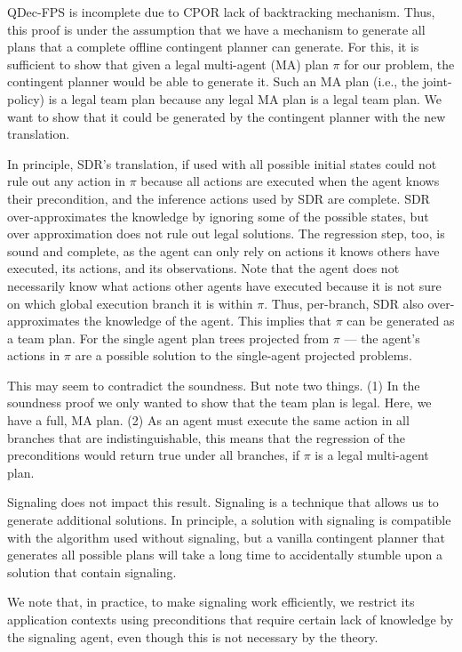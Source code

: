 \documentclass[letterpaper]{article} %
\theoremstyle{definition}
\begin{document}
{
QDec-FPS is incomplete due to CPOR lack of backtracking mechanism. Thus, this proof is under the assumption that we have a mechanism to generate all
plans that a complete offline contingent planner can generate. For this, it is sufficient to show that given a legal multi-agent (MA) plan $\pi$ for our problem, the contingent planner would be able to generate it. Such an MA plan (i.e., the joint-policy) is a legal team plan because any legal MA plan is a legal team plan. We want to show that it could be generated by the contingent planner with the new translation.

In principle, SDR's translation, if used with all possible initial states could not rule out any action in $\pi$ because all actions are executed when the agent knows their precondition, and the inference actions used by SDR are complete.
SDR over-approximates the knowledge by ignoring some of the possible states, but over approximation does not rule out legal solutions. The regression step, too, is sound and complete, as the agent can only rely on actions it knows others have executed, its actions, and its observations.
Note that the agent does not necessarily know what actions other agents have executed because it is not sure on which global execution branch it is within $\pi$. Thus, per-branch, SDR also over-approximates the knowledge of the agent.
This implies that $\pi$ can be generated as a team plan.
For the single agent plan trees projected from $\pi$ --- the agent's actions in $\pi$ are a possible solution to the single-agent projected problems.%

This may seem to contradict the soundness. But note two things. (1) In the soundness proof we only wanted to show that the team plan is legal.
Here, we have a full, MA plan. (2) As an agent must execute the same action
in all branches that are indistinguishable, this means that the regression of
the preconditions would return true under all branches, if $\pi$ is a legal multi-agent plan.

Signaling does not impact this result. Signaling is a technique that allows us to generate additional solutions. In principle, a solution with signaling is compatible with the algorithm used without signaling, but a vanilla contingent planner that generates all possible plans will take a long time to accidentally stumble upon a solution that contain signaling.

We note that, in practice, to make signaling work efficiently, we restrict its application contexts using preconditions that require certain lack of knowledge by the signaling agent, even though this is
not necessary by the theory.
}
\end{document}
